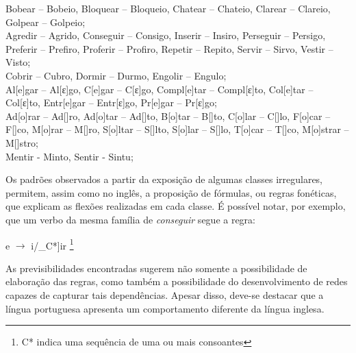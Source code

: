 \begin{center}

Bobear – Bobeio, Bloquear – Bloqueio, Chatear – Chateio, Clarear – Clareio, Golpear – Golpeio;\\

Agredir – Agrido, Conseguir – Consigo, Inserir – Insiro, Perseguir – Persigo, Preferir – Prefiro, Proferir – Profiro, Repetir – Repito, Servir –  Sirvo, Vestir – Visto;\\

Cobrir – Cubro, Dormir – Durmo, Engolir – Engulo;\\

 Al[e]gar – Al[ε]go, C[e]gar – C[ε]go, Compl[e]tar – Compl[ε]to,  Col[e]tar – Col[ε]to, Entr[e]gar – Entr[ε]go, Pr[e]gar – Pr[ε]go;\\

Ad[o]rar – Ad[\textopeno]ro, Ad[o]tar – Ad[\textopeno]to, B[o]tar – B[\textopeno]to, C[o]lar – C[\textopeno]lo, F[o]car – F[\textopeno]co, M[o]rar – M[\textopeno]ro, S[o]ltar – S[\textopeno]lto, S[o]lar – S[\textopeno]lo, T[o]car – T[\textopeno]co, M[o]strar – M[\textopeno]stro;\\

Mentir - Minto, Sentir - Sintu;

\end{center}

Os padrões observados a partir da exposição de algumas classes irregulares, permitem, assim como no inglês, a proposição de fórmulas, ou regras fonéticas, que explicam as flexões realizadas em cada classe. É possível notar, por exemplo, que um verbo da mesma família de \textit{conseguir} segue a regra:

\begin{center}
e $\rightarrow$ i/\_C*]ir \footnote{C* indica uma sequência de uma ou mais consoantes}
\end{center}


As previsibilidades encontradas sugerem não somente a possibilidade de elaboração das regras, como também a possibilidade do desenvolvimento de redes capazes de capturar tais dependências. Apesar disso, deve-se destacar que a língua portuguesa apresenta um comportamento diferente da língua inglesa. %

